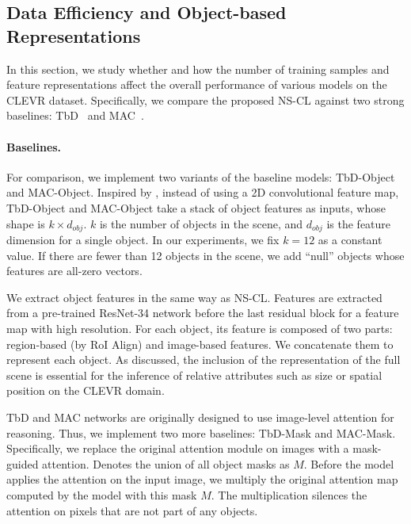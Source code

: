 \documentclass{article} %
\newcommand{\model}{NS-CL\xspace}
\newcommand{\revisioncolor}{}
\begin{document}
%

%
%
%
%
%

%

%
%

%
%
%
%


%

%

%

%

%
%
{
\revisioncolor
\subsection{Data Efficiency and Object-based Representations}
\label{sec:app:efficiency}
In this section, we study whether and how the number of training samples and feature representations affect the overall performance of various models on the CLEVR dataset. Specifically, we compare the proposed NS-CL against two strong baselines: TbD~\citep{Mascharka2018Transparency} and MAC~\citep{Hudson2018Compositional}.

\paragraph{Baselines. } For comparison, we implement two variants of the baseline models: TbD-Object and MAC-Object. Inspired by \cite{Anderson2017BottomUp}, instead of using a 2D convolutional feature map, TbD-Object and MAC-Object take a stack of object features as inputs, whose shape is $k \times d_{obj}$. $k$ is the number of objects in the scene, and $d_{obj}$ is the feature dimension for a single object. In our experiments, we fix $k = 12$ as a constant value. If there are fewer than 12 objects in the scene, we add ``null'' objects whose features are all-zero vectors.

We extract object features in the same way as \model. Features are extracted from a pre-trained ResNet-34 network before the last residual block for a feature map with high resolution. For each object, its feature is composed of two parts: region-based (by RoI Align) and image-based features. We concatenate them to represent each object. As discussed, the inclusion of the representation of the full scene is essential for the inference of relative attributes such as size or spatial position on the CLEVR domain.

TbD and MAC networks are originally designed to use image-level attention for reasoning. Thus, we implement two more baselines: TbD-Mask and MAC-Mask. Specifically, we replace the original attention module on images with a mask-guided attention. Denotes the union of all object masks as $M$. Before the model applies the attention on the input image, we multiply the original attention map computed by the model with this mask $M$. The multiplication silences the attention on pixels that are not part of any objects.

}
\end{document}
